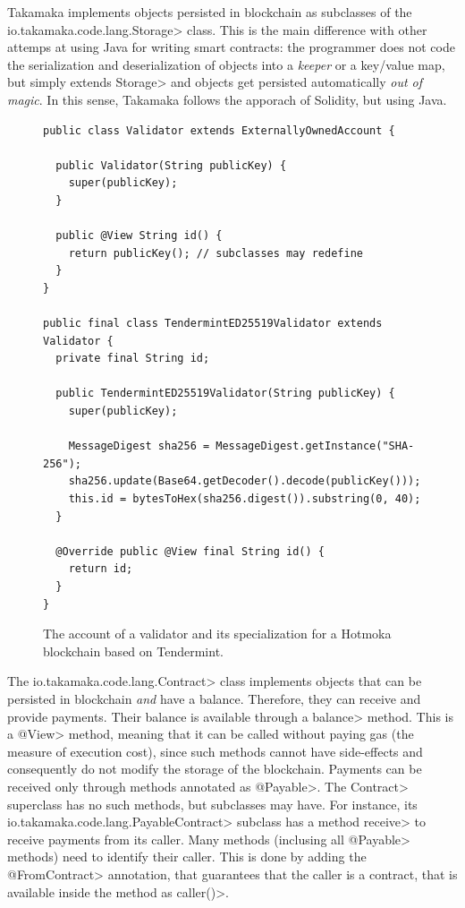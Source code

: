 Takamaka implements objects persisted in blockchain as subclasses of the
\<io.takamaka.code.lang.Storage> class.
This is the main difference with other attemps at using Java for writing smart contracts:
the programmer does not code the serialization and deserialization of objects into
a \emph{keeper} or a key/value map, but simply extends \<Storage> and objects get
persisted automatically \emph{out of magic}. In this sense, Takamaka follows the apporach of
Solidity, but using Java.


\begin{figure}[th]
  \begin{center}
    \begin{lstlisting}[language=Takamaka]
public class Validator extends ExternallyOwnedAccount {

  public Validator(String publicKey) {
    super(publicKey);
  }

  public @View String id() {
    return publicKey(); // subclasses may redefine
  }
}

public final class TendermintED25519Validator extends Validator {
  private final String id;

  public TendermintED25519Validator(String publicKey) {
    super(publicKey);

    MessageDigest sha256 = MessageDigest.getInstance("SHA-256");
    sha256.update(Base64.getDecoder().decode(publicKey()));
    this.id = bytesToHex(sha256.digest()).substring(0, 40);
  }

  @Override public @View final String id() {
    return id;
  }
}
    \end{lstlisting}
  \end{center}
  \caption{The account of a validator and its specialization for a Hotmoka blockchain based on Tendermint.}\label{fig:validator}
\end{figure}

The \<io.takamaka.code.lang.Contract> class implements objects that can be
persisted in blockchain \emph{and} have a balance. Therefore, they can receive and provide payments.
Their balance is available through a \<balance> method. This is a \<@View> method, meaning
that it can be called without paying gas (the measure of execution cost), since such methods
cannot have side-effects and consequently do not modify the storage of the blockchain.
Payments can be received only through methods annotated as \<@Payable>.
The \<Contract> superclass has no such methods, but subclasses may have.
For instance, its \<io.takamaka.code.lang.PayableContract> subclass has
a method \<receive> to receive payments from its caller. Many methods (inclusing all
\<@Payable> methods) need to identify their caller. This is done by adding the
\<@FromContract> annotation, that guarantees that the caller is a contract, that is available
inside the method as \<caller()>.

